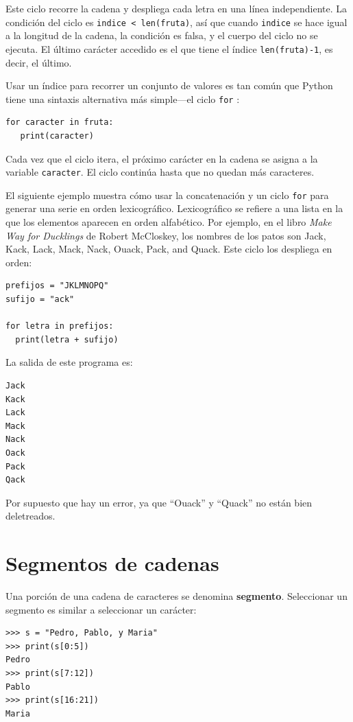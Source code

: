 Este ciclo recorre la cadena y despliega cada letra en una línea independiente.
La condición del ciclo es \texttt{indice < len(fruta)}, así que cuando
\texttt{indice} se hace igual a la longitud de la cadena, la condición
es falsa, y el cuerpo del ciclo no se ejecuta. El último carácter
accedido es el que tiene el índice \texttt{len(fruta)-1}, es decir,
el último.

Usar un índice para recorrer un conjunto de valores es tan común que
Python tiene una sintaxis alternativa más simple—el ciclo \texttt{for}
:

\begin{verbatim}
for caracter in fruta:
   print(caracter)
\end{verbatim}

Cada vez que el ciclo itera, el próximo carácter en la cadena se asigna
a la variable \texttt{caracter}. El ciclo continúa hasta que no quedan
más caracteres.

  

El siguiente ejemplo muestra cómo usar la concatenación y un ciclo
\texttt{for} para generar una serie en orden lexicográfico. Lexicográfico
se refiere a una lista en la que los elementos aparecen en orden alfabético.
Por ejemplo, en el libro {\em Make Way for Ducklings} de Robert
McCloskey, los nombres de los patos son Jack, Kack, Lack, Mack, Nack,
Ouack, Pack, and Quack. Este ciclo los despliega en orden:
\begin{verbatim}
prefijos = "JKLMNOPQ"
sufijo = "ack"

for letra in prefijos:
  print(letra + sufijo)
\end{verbatim}

La salida de este programa es:
\begin{verbatim}
Jack
Kack
Lack
Mack
Nack
Oack
Pack
Qack
\end{verbatim}

Por supuesto que hay un error, ya que ``Ouack'' y ``Quack'' no
están bien deletreados.

\section{Segmentos de cadenas }

\label{slice}  

Una porción de una cadena de caracteres se denomina \textbf{segmento}.
Seleccionar un segmento es similar a seleccionar un carácter:
\begin{verbatim}
>>> s = "Pedro, Pablo, y Maria"
>>> print(s[0:5])
Pedro
>>> print(s[7:12])
Pablo
>>> print(s[16:21])
Maria
\end{verbatim}

